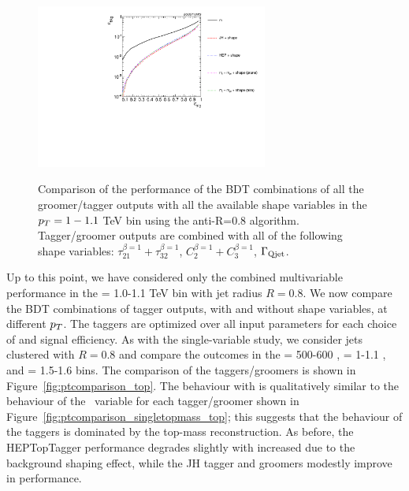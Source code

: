 \begin{figure}
\centering
{\includegraphics[width=0.68\textwidth]{./Figures/TTagging/multi_variable/pT.1TeV.R.0.8/Rocs_optimum.pdf}}
\caption{Comparison of the performance of the BDT combinations of all the groomer/tagger outputs with all the available shape variables in the $p_T = 1-1.1$ TeV bin using the anti-\kT R=0.8 algorithm. Tagger/groomer outputs are combined with all of the following shape variables: $\tau_{21}^{\beta=1}+\tau_{32}^{\beta=1}$, $C_{2}^{\beta=1}+C_{3}^{\beta=1}$, $\Gamma_{\rm Qjet}$.}
\label{fig:pt1000_allcompare_AKt_R08_Final}
\end{figure}



Up to this point, we have  considered only the combined multivariable performance in the \pt =  1.0-1.1 TeV bin with jet radius $R=0.8$. We now compare the BDT combinations of tagger outputs, with and without shape variables, at different $p_T$. The taggers are optimized over all input parameters for each choice of \pt and signal efficiency. As with the single-variable study, we consider \antikt jets clustered with $R=0.8$ and compare the outcomes in the \pt = 500-600 \GeV, \pt = 1-1.1 \TeV, and \pt = 1.5-1.6 \TeV bins. The comparison of the taggers/groomers is shown in Figure~\ref{fig:ptcomparison_top}. The behaviour with \pt is qualitatively similar to the behaviour of the \topmass~variable for each tagger/groomer shown in Figure~\ref{fig:ptcomparison_singletopmass_top}; this suggests that the \pt behaviour of the taggers is dominated by the top-mass reconstruction. As before, the HEPTopTagger performance degrades slightly with increased \pt due to the background shaping effect, while the JH tagger and groomers modestly improve in performance.

